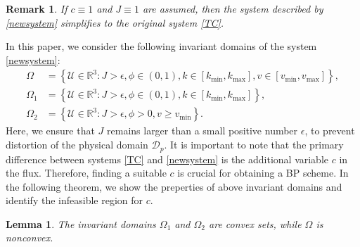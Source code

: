 \documentclass[times,final,11pt]{elsarticle}
\newtheorem{lemma}[theorem]{Lemma}
\newtheorem{remark}{Remark}[section]
\numberwithin{equation}{section}
\theoremstyle{definition}
\theoremstyle{remark}
\newcommand{\BU}{\mathbf{U}}
\begin{document}
\begin{remark}
	If $c \equiv 1$ and $J \equiv 1$ are assumed, then the system described by \eqref{newsystem} simplifies to the original system \eqref{TC}.
\end{remark}
In this paper, we consider the following invariant domains of the system \eqref{newsystem}:
\begin{align}
	\Omega &= \left\{\boldsymbol{\mathcal{U}} \in \mathbb{R}^3: J > \epsilon, \phi \in (0, 1), k \in [k_{\min}, k_{\max}], v\in [v_{\min}, v_{\max}] \right\}, \label{eq:270} \\
	\Omega_1 &= \left\{\boldsymbol{\mathcal{U}} \in \mathbb{R}^3: J > \epsilon, \phi \in (0, 1), k \in [k_{\min}, k_{\max}] \right\}, \nonumber \\
	\Omega_2 &= \left\{\boldsymbol{\mathcal{U}} \in \mathbb{R}^3: J > \epsilon, \phi > 0, v \geq v_{\min} \right\}. \nonumber
\end{align}
Here, we ensure that \(J\) remains larger than a small positive number \(\epsilon\), to prevent distortion of the physical domain \(\mathcal{D}_p\). It is important to note that the primary difference between systems \eqref{TC} and \eqref{newsystem} is the additional variable $c$ in the flux. Therefore, finding a suitable $c$ is crucial for obtaining a BP scheme. In the following theorem, we show the preperties of above invariant domains and identify the infeasible region for $c$.
\begin{lemma}
\label{778}
	The invariant domains $\Omega_1$ and $\Omega_2$ are convex sets, while $\Omega$ is nonconvex.
\end{lemma}
\end{document}

